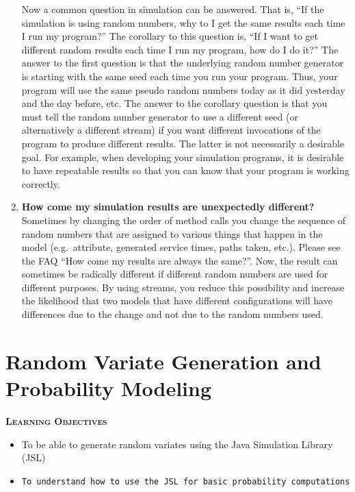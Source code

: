 \documentclass[
]{book}
\theoremstyle{definition}
\theoremstyle{definition}
\theoremstyle{definition}
\theoremstyle{definition}
\theoremstyle{remark}
\begin{document}
\begin{enumerate}
  Now a common question in simulation can be answered. That is, ``If the simulation is using random numbers, why to I get the same results each time I run my program?'' The corollary to this question is, ``If I want to get different random results each time I run my program, how do I do it?'' The answer to the first question is that the underlying random number generator is starting with the same seed each time you run your program. Thus, your program will use the same pseudo random numbers today as it did yesterday and the day before, etc. The answer to the corollary question is that you must tell the random number generator to use a different seed (or alternatively a different stream) if you want different invocations of the program to produce different results. The latter is not necessarily a desirable goal. For example, when developing your simulation programs, it is desirable to have repeatable results so that you can know that your program is working correctly.
\item
  \textbf{How come my simulation results are unexpectedly different?}
  Sometimes by changing the order of method calls you change the sequence of random numbers that are assigned to various things that happen in the model (e.g.~attribute, generated service times, paths taken, etc.). Please see the FAQ ``How come my results are always the same?''. Now, the result can sometimes be radically different if different random numbers are used for different purposes. By using streams, you reduce this possibility and increase the likelihood that two models that have different configurations will have differences due to the change and not due to the random numbers used.
\end{enumerate}

\hypertarget{random-variate-generation-and-probability-modeling}{%
\chapter{Random Variate Generation and Probability Modeling}\label{random-variate-generation-and-probability-modeling}}

\textbf{\textsc{Learning Objectives}}

\begin{itemize}
\item
  To be able to generate random variates using the Java Simulation
  Library (JSL)
\item
\begin{verbatim}
To understand how to use the JSL for basic probability computations
\end{verbatim}
\end{itemize}
\end{document}
